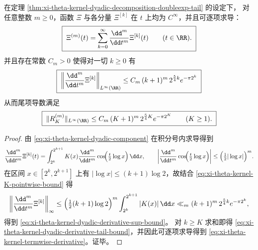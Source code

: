 \begin{proposition}[全阶导数的尺度预算]\label{prop:xi-theta-kernel-dyadic-all-derivatives-budget}
在定理 \ref{thm:xi-theta-kernel-dyadic-decomposition-doubleexp-tail} 的设定下，
对任意整数 \(m\ge 0\)，函数 \(\Xi\) 与各分量 \(\Xi^{[k]}\) 在 \(t\) 上均为 \(C^\infty\)，并且可逐项求导：
\begin{equation}\label{eq:xi-theta-kernel-termwise-derivative}
\boxed{\;
\Xi^{(m)}(t)=\sum_{k=0}^{\infty}\frac{\dd^m}{\dd t^m}\Xi^{[k]}(t)\qquad(t\in\RR).\;}
\end{equation}
并且存在常数 \(C_m>0\) 使得对一切 \(k\ge 0\) 有
\begin{equation}\label{eq:xi-theta-kernel-dyadic-derivative-sup-bound}
\boxed{\;
\left\|\frac{\dd^m}{\dd t^m}\Xi^{[k]}\right\|_{L^\infty(\RR)}
\le C_m\,(k+1)^m\,2^{\frac54 k}e^{-\pi 2^{k}}\;}
\end{equation}
从而尾项导数满足
\begin{equation}\label{eq:xi-theta-kernel-dyadic-derivative-tail-bound}
\boxed{\;
\|R_K^{(m)}\|_{L^\infty(\RR)}
\le C_m\,(K+1)^m\,2^{\frac54 K}e^{-\pi 2^{K}}
\qquad(K\ge 1).\;}
\end{equation}
\end{proposition}
\begin{proof}
由 \eqref{eq:xi-theta-kernel-dyadic-component} 在积分号内求导得到
\[
\frac{\dd^m}{\dd t^m}\Xi^{[k]}(t)
=\int_{2^k}^{2^{k+1}}K(x)\frac{\dd^m}{\dd t^m}\cos\!\Bigl(\tfrac{t}{2}\log x\Bigr)\,\dd x,
\qquad
\left|\frac{\dd^m}{\dd t^m}\cos\!\Bigl(\tfrac{t}{2}\log x\Bigr)\right|
\le \Bigl(\tfrac12|\log x|\Bigr)^m.
\]
在区间 \(x\in[2^k,2^{k+1}]\) 上有 \(|\log x|\le (k+1)\log 2\)，故结合 \eqref{eq:xi-theta-kernel-K-pointwise-bound} 得
\[
\left\|\frac{\dd^m}{\dd t^m}\Xi^{[k]}\right\|_{\infty}
\le \Bigl(\tfrac12 (k+1)\log 2\Bigr)^m\int_{2^k}^{2^{k+1}}|K(x)|\,\dd x
\ll_m (k+1)^m\,2^{\frac54 k}e^{-\pi 2^{k}},
\]
得到 \eqref{eq:xi-theta-kernel-dyadic-derivative-sup-bound}。
对 \(k\ge K\) 求和即得 \eqref{eq:xi-theta-kernel-dyadic-derivative-tail-bound}，并因此可逐项求导得到 \eqref{eq:xi-theta-kernel-termwise-derivative}。证毕。
\end{proof}

